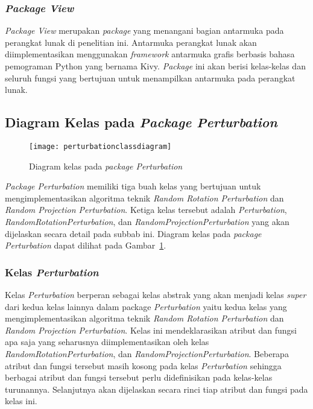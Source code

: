 \subsubsection{\textit{Package View}}
\label{subsubsec:package-view}

\textit{Package View} merupakan \textit{package} yang menangani bagian antarmuka pada perangkat lunak di penelitian ini. Antarmuka perangkat lunak akan diimplementasikan menggunakan \textit{framework} antarmuka grafis berbasis bahasa pemograman Python yang bernama Kivy. \textit{Package} ini akan berisi kelas-kelas dan seluruh fungsi yang bertujuan untuk menampilkan antarmuka pada perangkat lunak.

\subsection{Diagram Kelas pada \textit{Package Perturbation}}
\label{subsec:diagram-kelas-perturbation}

\begin{figure}
	\centering
	\texttt{[image: perturbationclassdiagram]}
	\caption{Diagram kelas pada \textit{package Perturbation}}
	\label{fig:perturbationclassdiagram}
\end{figure}

\textit{Package Perturbation} memiliki tiga buah kelas yang bertujuan untuk mengimplementasikan algoritma teknik \textit{Random Rotation Perturbation} dan \textit{Random Projection Perturbation}. Ketiga kelas tersebut adalah \textit{Perturbation}, \textit{RandomRotationPerturbation}, dan \textit{RandomProjectionPerturbation} yang akan dijelaskan secara detail pada subbab ini. Diagram kelas pada \textit{package Perturbation} dapat dilihat pada Gambar~\ref{fig:perturbationclassdiagram}.

\subsubsection{Kelas \textit{Perturbation}}
\label{subsubsec:kelas-perturbation}

Kelas \textit{Perturbation} berperan sebagai kelas abstrak yang akan menjadi kelas \textit{super} dari kedua kelas lainnya dalam package \textit{Perturbation} yaitu kedua kelas yang mengimplementasikan algoritma teknik \textit{Random Rotation Perturbation} dan \textit{Random Projection Perturbation}. Kelas ini mendeklarasikan atribut dan fungsi apa saja yang seharusnya diimplementasikan oleh kelas \textit{RandomRotationPerturbation}, dan \textit{RandomProjectionPerturbation}. Beberapa atribut dan fungsi tersebut masih kosong pada kelas \textit{Perturbation} sehingga berbagai atribut dan fungsi tersebut perlu didefinisikan pada kelas-kelas turunannya. Selanjutnya akan dijelaskan secara rinci tiap atribut dan fungsi pada kelas ini.

